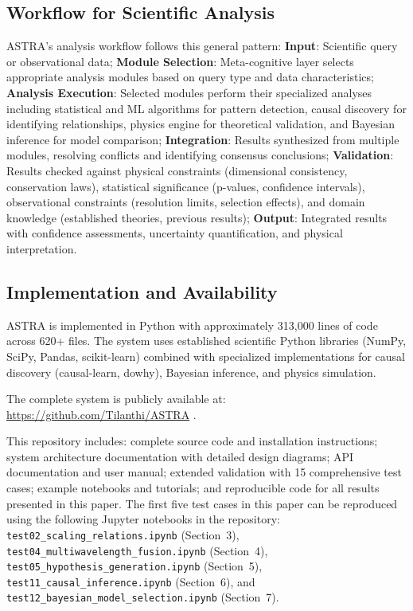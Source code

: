 \documentclass[usenatbib]{rasti}
\begin{document}
\subsection{Workflow for Scientific Analysis}

ASTRA's analysis workflow follows this general pattern: \textbf{Input}: Scientific query or observational data; \textbf{Module Selection}: Meta-cognitive layer selects appropriate analysis modules based on query type and data characteristics; \textbf{Analysis Execution}: Selected modules perform their specialized analyses including statistical and ML algorithms for pattern detection, causal discovery for identifying relationships, physics engine for theoretical validation, and Bayesian inference for model comparison; \textbf{Integration}: Results synthesized from multiple modules, resolving conflicts and identifying consensus conclusions; \textbf{Validation}: Results checked against physical constraints (dimensional consistency, conservation laws), statistical significance (p-values, confidence intervals), observational constraints (resolution limits, selection effects), and domain knowledge (established theories, previous results); \textbf{Output}: Integrated results with confidence assessments, uncertainty quantification, and physical interpretation.

\subsection{Implementation and Availability}

ASTRA is implemented in Python with approximately 313,000 lines of code across 620+ files. The system uses established scientific Python libraries (NumPy, SciPy, Pandas, scikit-learn) combined with specialized implementations for causal discovery (causal-learn, dowhy), Bayesian inference, and physics simulation.

The complete system is publicly available at: \url{https://github.com/Tilanthi/ASTRA} \cite{astra_github}.

This repository includes: complete source code and installation instructions; system architecture documentation with detailed design diagrams; API documentation and user manual; extended validation with 15 comprehensive test cases; example notebooks and tutorials; and reproducible code for all results presented in this paper. The first five test cases in this paper can be reproduced using the following Jupyter notebooks in the repository: \texttt{test02\_scaling\_relations.ipynb} (Section~3), \texttt{test04\_multiwavelength\_fusion.ipynb} (Section~4), \texttt{test05\_hypothesis\_generation.ipynb} (Section~5), \texttt{test11\_causal\_inference.ipynb} (Section~6), and \texttt{test12\_bayesian\_model\_selection.ipynb} (Section~7).
\end{document}
